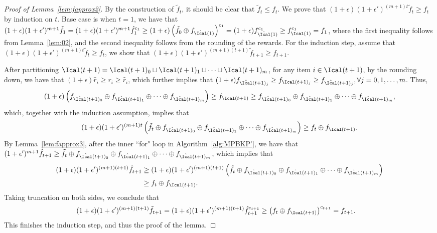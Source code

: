 \begin{proof}[Proof of Lemma~\ref{lem:fapprox2}]
	By the construction of $\tilde{f}_t$, it should be clear that $\tilde{f}_t\le f_t$. We prove that $(1+\epsilon)(1+\epsilon')^{(m+1)t}\tilde{f}_t\ge f_t$ by induction on $t$. Base case is when $t=1$, we have that $(1+\epsilon)(1+\epsilon')^{m+1}\tilde{f}_1 = (1+\epsilon)(1+\epsilon')^{m+1}\hat{f}_1^{c_1} \ge (1+\epsilon)\left(\tilde{f}_0\oplus f_{\hat{\Ical}(1)}\right)^{c_1} = (1+\epsilon)f_{\hat{\Ical}(1)}^{c_1}\ge  f_{\Ical(1)}^{c_1} = f_1$, where the first inequality follows from Lemma~\ref{lem:02}, and the second inequality follows from the rounding of the rewards. For the induction step, assume that $(1+\epsilon)(1+\epsilon')^{(m+1)t}\tilde{f}_t\ge f_t$, we show that $(1+\epsilon)(1+\epsilon')^{(m+1)(t+1)}\tilde{f}_{t+1}\ge f_{t+1}$.
	
	After partitioning $\Ical(t+1) = \Ical(t+1)_0\sqcup \Ical(t+1)_1\sqcup\cdots\sqcup \Ical(t+1)_m$, for any item $i\in \Ical(t+1)$, by the rounding down, we have that $(1+\epsilon)\hat{r}_i\ge r_i\ge \hat{r}_i$, which further implies that $(1+\epsilon)f_{\hat{\Ical}(t+1)_j}\ge f_{{\Ical}(t+1)_j}\ge f_{\hat{\Ical}(t+1)_j}, \forall j=0,1,\ldots,m$. Thus, 
	\begin{align*}
	    &\quad (1+\epsilon)\left(f_{\hat{\Ical}(t+1)_0}\oplus f_{\hat{\Ical}(t+1)_1}\oplus\cdots \oplus f_{\hat{\Ical}(t+1)_m}\right)\ge f_{\Ical(t+1)}
	    \ge f_{\hat{\Ical}(t+1)_0}\oplus f_{\hat{\Ical}(t+1)_1}\oplus\cdots \oplus f_{\hat{\Ical}(t+1)_m},
	\end{align*}
	which, together with the induction assumption, implies that 
	$$
	(1+\epsilon)(1+\epsilon')^{(m+1)t}\left(\tilde{f}_t\oplus f_{\hat{\Ical}(t+1)_0}\oplus f_{\hat{\Ical}(t+1)_1}\oplus\cdots \oplus f_{\hat{\Ical}(t+1)_m}\right)\ge f_t \oplus f_{\Ical(t+1)}.%
	$$
	By Lemma~\ref{lem:fapprox3}, after the inner ``for" loop in Algorithm~\ref{alg:MPBKP'}, we have that $(1+\epsilon')^{m+1}\hat{f}_{t+1}\ge \tilde{f}_t\oplus f_{\hat{\Ical}(t+1)_0}\oplus f_{\hat{\Ical}(t+1)_1}\oplus\cdots \oplus f_{\hat{\Ical}(t+1)_m}$, which implies that 
	\begin{align*}
	 (1+\epsilon)(1+\epsilon')^{(m+1)(t+1)}\hat{f}_{t+1}&\ge (1+\epsilon)(1+\epsilon')^{(m+1)(t+1)}\left(\tilde{f}_t\oplus f_{\hat{\Ical}(t+1)_0}\oplus f_{\hat{\Ical}(t+1)_1}\oplus\cdots \oplus f_{\hat{\Ical}(t+1)_m}\right)\\&\ge f_t \oplus f_{\Ical(t+1)}.
	\end{align*}
	Taking truncation on both sides, we conclude that
	\begin{align*}
	    (1+\epsilon)(1+\epsilon')^{(m+1)(t+1)}\tilde{f}_{t+1} &= (1+\epsilon)(1+\epsilon')^{(m+1)(t+1)}\hat{f}_{t+1}^{c_{t+1}}\ge \left(f_t \oplus f_{\Ical(t+1)}\right)^{c_{t+1}}= f_{t+1}.
	\end{align*}
	This finishes the induction step, and thus the proof of the lemma.
\end{proof}


